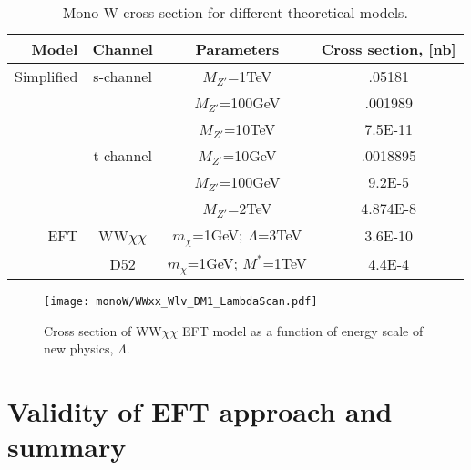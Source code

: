 \begin{table}[tp]
  \begin{tabular}{r|c|c|c}
    Model 	& Channel 	  & Parameters	    & Cross section, [nb] \\
    \midrule
    Simplified  & s-channel	  & $M_{Z'}$=1TeV    & .05181 \\
		&		  & $M_{Z'}$=100GeV  & .001989 \\
		&		  & $M_{Z'}$=10TeV   & 7.5E-11 \\
		& t-channel	  & $M_{Z'}$=10GeV   & .0018895 \\
		&		  & $M_{Z'}$=100GeV  & 9.2E-5 \\
		&		  & $M_{Z'}$=2TeV    & 4.874E-8 \\
    \midrule
    EFT 	& WW$\chi\chi$	  & $m_{\chi}$=1GeV; $\Lambda$=3TeV    & 3.6E-10 \\
		& D52		  & $m_{\chi}$=1GeV; $M^{*}$=1TeV	& 4.4E-4 \\
  \end{tabular}
  \caption{Mono-W cross section for different theoretical models.}
  \label{tab:TriggerDetails}
\end{table}


\begin{figure}[hb]
 \texttt{[image: monoW/WWxx\_Wlv\_DM1\_LambdaScan.pdf]}
  \caption{Cross section of WW$\chi\chi$ EFT model as a function of energy scale of new physics, $\Lambda$.}
  \label{fig:lambdaScan}
\end{figure}

\section{Validity of EFT approach and summary}



